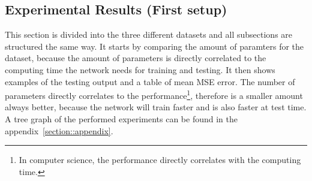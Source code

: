  \subsection{Experimental Results (First setup)} \label{subsection::exp_results}
  This section is divided into the three different datasets and all subsections are structured the same way. It starts by comparing the amount of paramters
  for the dataset, because the amount of parameters is directly correlated to the computing time the network needs for training and testing. It then shows
  examples of the testing output and a table of mean MSE error.
  The number of parameters directly correlates to the performance\footnote{In computer science, the performance directly correlates with the computing time.}, 
  therefore is a smaller amount always better, because the network will train faster and is also faster at test time. A tree graph of the performed experiments
  can be found in the appendix~\ref{section::appendix}.
  
